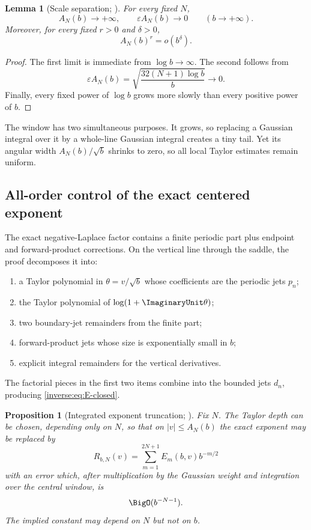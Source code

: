 \documentclass[11pt,oneside]{article}
\newtheorem{proposition}[proposition]{Proposition}
\newtheorem{lemma}[lemma]{Lemma}
\theoremstyle{definition}
\theoremstyle{remark}
\begin{document}
\begin{lemma}[Scale separation; \Formalized]
\label{inverse:lem:central-scale}
For every fixed $N$,
\[
 A_N(b)\longrightarrow+\infty,\qquad
 \varepsilon A_N(b)\longrightarrow0
 \qquad(b\to+\infty).
\]
Moreover, for every fixed $r>0$ and $\delta>0$,
\[
 A_N(b)^r=o(b^\delta).
\]
\end{lemma}

\begin{proof}
The first limit is immediate from $\log b\to\infty$.  The second follows
from
\[
 \varepsilon A_N(b)
 =\sqrt{\frac{32(N+1)\log b}{b}}\longrightarrow0.
\]
Finally, every fixed power of $\log b$ grows more slowly than every
positive power of $b$.
\end{proof}

The window has two simultaneous purposes.  It grows, so replacing a
Gaussian integral over it by a whole-line Gaussian integral creates a
tiny tail.  Yet its angular width
$A_N(b)/\sqrt b$ shrinks to zero, so all local Taylor estimates remain
uniform.

\subsection{All-order control of the exact centered exponent}

The exact negative-Laplace factor contains a finite periodic part plus
endpoint and forward-product corrections.  On the vertical line through
the saddle, the proof decomposes it into:
\begin{enumerate}
\item a Taylor polynomial in $\theta=v/\sqrt b$ whose coefficients are
the periodic jets $p_n$;
\item the Taylor polynomial of $\log(1+\ImaginaryUnit\theta)$;
\item two boundary-jet remainders from the finite part;
\item forward-product jets whose size is exponentially small in $b$;
\item explicit integral remainders for the vertical derivatives.
\end{enumerate}
The factorial pieces in the first two items combine into the bounded
jets $d_n$, producing \eqref{inverse:eq:E-closed}.

\begin{proposition}[Integrated exponent truncation; \Formalized]
\label{inverse:prop:exponent-truncation}
Fix $N$.  The Taylor depth can be chosen, depending only on $N$, so that
on $|v|\leq A_N(b)$ the exact exponent may be replaced by
\[
 R_{b,N}(v)
 =\sum_{m=1}^{2N+1}E_m(b,v)b^{-m/2}
\]
with an error which, after multiplication by the Gaussian weight and
integration over the central window, is
\[
 \BigO(b^{-N-1}).
\]
The implied constant may depend on $N$ but not on $b$.
\end{proposition}
\end{document}
